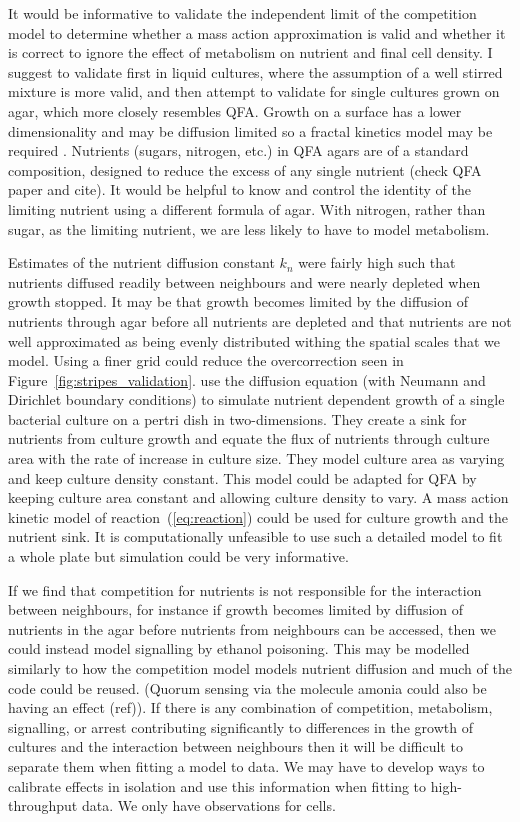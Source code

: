 It would be informative to validate the independent limit of the
competition model to determine whether a mass action approximation is
valid and whether it is correct to ignore the effect of metabolism on
nutrient and final cell density. I suggest to validate first in liquid
cultures, where the assumption of a well stirred mixture is more
valid, and then attempt to validate for single cultures grown on agar,
which more closely resembles QFA. Growth on a surface has a lower
dimensionality and may be diffusion limited so a fractal kinetics
model may be required \citep{Kopelman1988,savageau1995}. Nutrients
(sugars, nitrogen, etc.) in QFA agars are of a standard composition,
designed to reduce the excess of any single nutrient (check QFA paper
and cite). It would be helpful to know and control the identity of the
limiting nutrient using a different formula of agar. With nitrogen,
rather than sugar, as the limiting nutrient, we are less likely to
have to model metabolism.


Estimates of the nutrient diffusion constant \(k_{n}\) were fairly
high such that nutrients diffused readily between neighbours and were
nearly depleted when growth stopped. It may be that growth becomes
limited by the diffusion of nutrients through agar before all
nutrients are depleted and that nutrients are not well approximated as
being evenly distributed withing the spatial scales that we
model. Using a finer grid could reduce the overcorrection seen in
Figure~\ref{fig:stripes_validation}. \citet{Reo2014} use the diffusion
equation (with Neumann and Dirichlet boundary conditions) to simulate
nutrient dependent growth of a single bacterial culture on a pertri
dish in two-dimensions. They create a sink for nutrients from culture
growth and equate the flux of nutrients through culture area with the
rate of increase in culture size. They model culture area as varying
and keep culture density constant. This model could be adapted for QFA
by keeping culture area constant and allowing culture density to
vary. A mass action kinetic model of reaction~(\ref{eq:reaction})
could be used for culture growth and the nutrient sink. It is
computationally unfeasible to use such a detailed model to fit a whole
plate but simulation could be very informative.

If we find that competition for nutrients is not responsible for the
interaction between neighbours, for instance if growth becomes limited
by diffusion of nutrients in the agar before nutrients from neighbours
can be accessed, then we could instead model signalling by ethanol
poisoning. This may be modelled similarly to how the competition model
models nutrient diffusion and much of the code could be reused.
(Quorum sensing via the molecule amonia could also be having an effect
(ref)). If there is any combination of competition, metabolism,
signalling, or arrest contributing significantly to differences in the
growth of cultures and the interaction between neighbours then it will
be difficult to separate them when fitting a model to data. We may
have to develop ways to calibrate effects in isolation and use this
information when fitting to high-throughput data. We only have
observations for cells.

